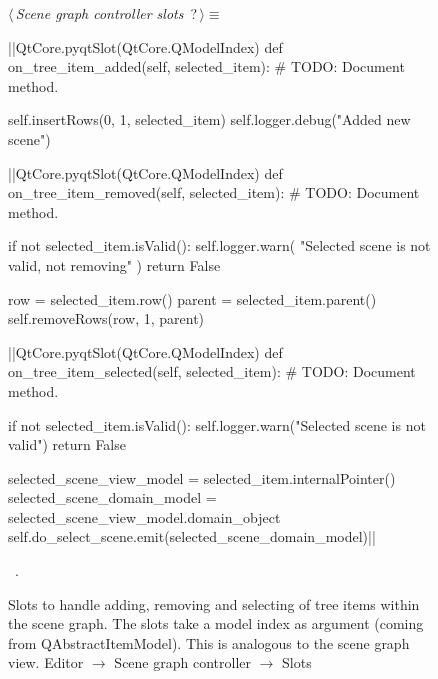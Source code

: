 \documentclass[%
    a4paper,    %
    justified,  %
    nobib,      %
    openany     %
]{tufte-book}
\begin{document}
\begin{figure}
\begin{flushleft} \small
\begin{minipage}{\linewidth}\label{scrap50}\raggedright\small
{} $\langle\,${\itshape Scene graph controller slots}\nobreak\ {\footnotesize {?}}$\,\rangle\equiv$
\vspace{-1ex}
\begin{pythoncode}
|\normalfont{}\fontfamily{}|QtCore.pyqtSlot(QtCore.QModelIndex)
def on_tree_item_added(self, selected_item):
    # TODO: Document method.

    self.insertRows(0, 1, selected_item)
    self.logger.debug("Added new scene")

|\normalfont{}\fontfamily{}|QtCore.pyqtSlot(QtCore.QModelIndex)
def on_tree_item_removed(self, selected_item):
    # TODO: Document method.

    if not selected_item.isValid():
        self.logger.warn(
            "Selected scene is not valid, not removing"
        )
        return False

    row = selected_item.row()
    parent = selected_item.parent()
    self.removeRows(row, 1, parent)

|\normalfont{}\fontfamily{}|QtCore.pyqtSlot(QtCore.QModelIndex)
def on_tree_item_selected(self, selected_item):
    # TODO: Document method.

    if not selected_item.isValid():
        self.logger.warn("Selected scene is not valid")
        return False

    selected_scene_view_model = selected_item.internalPointer()
    selected_scene_domain_model  = selected_scene_view_model.domain_object
    self.do_select_scene.emit(selected_scene_domain_model)|\NWsep|
\end{pythoncode}
\vspace{1.5ex}
\footnotesize
\begin{list}{}{\setlength{\itemsep}{-\parsep}\setlength{\itemindent}{-\leftmargin}}
\item \NWtxtMacroRefIn\ .

\item{}
\end{list}
\end{minipage}\vspace{4ex}
\end{flushleft}
\caption{Slots to handle adding, removing and selecting of tree items within the
  scene graph. The slots take a model index as argument (coming from
  QAbstractItemModel). This is analogous to the scene graph view.
  \newline{}\newline{}Editor $\rightarrow$ Scene graph controller
  $\rightarrow$ Slots}
\label{editor:lst:scene-graph-controller:slots:on-tree-item-added-removed-selected}
\end{figure}
\end{document}
